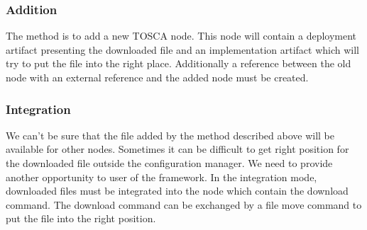 \subsubsection*{Addition}
The method is to add a new TOSCA node.
This node will contain a deployment artifact presenting the downloaded file and an implementation artifact which will try to put the file into the right place.
Additionally a reference between the old node with an external reference and the added node must be created.

\subsubsection{Integration}
We can't be sure that the file added by the method described above will be available for other nodes.
Sometimes it can be difficult to get right position for the downloaded file outside the configuration manager.
We need to provide another opportunity to user of the framework.
In the integration mode, downloaded files must be integrated into the node which contain the download command.
The download command can be exchanged by a file move command to put the file into the right position.

